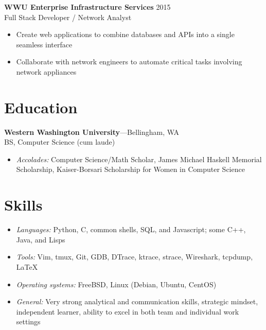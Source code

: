 \documentclass[11pt, letterpaper]{article}
\begin{document}
\textbf{WWU Enterprise Infrastructure Services} \hfill 2015\\
Full Stack Developer / Network Analyst

\begin{itemize}
    \item Create web applications to combine databases and APIs into a single seamless interface
    \item Collaborate with network engineers to automate critical tasks involving network appliances
\end{itemize}

\section*{Education}

\textbf{Western Washington University}---Bellingham, WA\\
BS, Computer Science (cum laude)

\begin{itemize}
    \item \textit{Accolades:} Computer Science/Math Scholar, James Michael Haskell Memorial Scholarship, Kaiser-Borsari Scholarship for Women in Computer Science
\end{itemize}

\section*{Skills}
\setlength{\parskip}{11pt}

\raggedright
\begin{itemize}
    \item \textit{Languages:} Python, C, common shells, SQL, and Javascript; some C++, Java, and Lisps
    \item \textit{Tools:} Vim, tmux, Git, GDB, DTrace, ktrace, strace, Wireshark, tcpdump, \LaTeX
    \item \textit{Operating systems:} FreeBSD, Linux (Debian, Ubuntu, CentOS)
    \item \textit{General:} Very strong analytical and communication skills, strategic mindset, independent learner, ability to excel in both team and individual work settings
\end{itemize}
\end{document}

